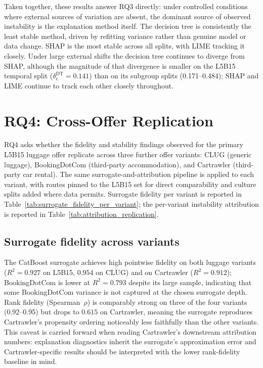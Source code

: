\documentclass[oneside]{memoir} %
\begin{document}
Taken together, these results answer RQ3 directly: under controlled conditions where external sources of variation are absent, the dominant source of observed instability is the explanation method itself. The decision tree is consistently the least stable method, driven by refitting variance rather than genuine model or data change. SHAP is the most stable across all splits, with LIME tracking it closely. Under large external shifts the decision tree continues to diverge from SHAP, although the magnitude of that divergence is smaller on the L5B15 temporal split ($\delta_e^{\mathrm{DT}} = 0.141$) than on its subgroup splits (0.171--0.484); SHAP and LIME continue to track each other closely throughout.

\section{RQ4: Cross-Offer Replication} \label{sec:rq4}

RQ4 asks whether the fidelity and stability findings observed for the primary L5B15 luggage offer replicate across three further offer variants: CLUG (generic luggage), BookingDotCom (third-party accommodation), and Cartrawler (third-party car rental). The same surrogate-and-attribution pipeline is applied to each variant, with routes pinned to the L5B15 set for direct comparability and culture splits added where data permits. Surrogate fidelity per variant is reported in Table~\ref{tab:surrogate_fidelity_per_variant}; the per-variant instability attribution is reported in Table~\ref{tab:attribution_replication}.



\subsection{Surrogate fidelity across variants}

The CatBoost surrogate achieves high pointwise fidelity on both luggage variants ($R^2 = 0.927$ on L5B15, $0.954$ on CLUG) and on Cartrawler ($R^2 = 0.912$); BookingDotCom is lower at $R^2 = 0.793$ despite its large sample, indicating that some BookingDotCom variance is not captured at the chosen surrogate depth. Rank fidelity (Spearman~$\rho$) is comparably strong on three of the four variants (0.92--0.95) but drops to $0.615$ on Cartrawler, meaning the surrogate reproduces Cartrawler's propensity ordering noticeably less faithfully than the other variants. This caveat is carried forward when reading Cartrawler's downstream attribution numbers: explanation diagnostics inherit the surrogate's approximation error and Cartrawler-specific results should be interpreted with the lower rank-fidelity baseline in mind.
\end{document}
